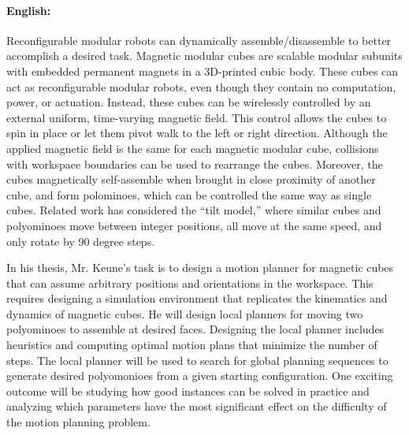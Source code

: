 \documentclass[11pt,a4paper,twoside,titlepage]{scrbook}
\theoremstyle{definition}
\begin{document}
\medskip

\paragraph{English:}
Reconfigurable modular robots can dynamically assemble/disassemble to better accomplish a desired task.
Magnetic modular cubes are scalable modular subunits with embedded permanent magnets in a 3D-printed cubic body.
These cubes can act as reconfigurable modular robots, even though they contain no computation, power, or actuation.
Instead, these cubes can be wirelessly controlled by an external uniform, time-varying magnetic field.
This control allows the cubes to spin in place or let them pivot walk to the left or right direction.
Although the applied magnetic field is the same for each magnetic modular cube, collisions with workspace boundaries can be used to rearrange the cubes.
Moreover, the cubes magnetically self-assemble when brought in close proximity of another cube, and form polominoes, which can be controlled the same way as single cubes.  
Related work has considered the “tilt model,” where similar cubes and polyominoes move between integer positions, all move at the same speed, and only rotate by 90 degree steps.

In his thesis, Mr. Keune's task is to design a motion planner for magnetic cubes that can assume arbitrary positions and orientations in the workspace.
This requires designing a simulation environment that replicates the kinematics and dynamics of magnetic cubes.
He will design local planners for moving two polyominoes to assemble at desired faces.
Designing the local planner includes heuristics and computing optimal motion plans that minimize the number of steps.
The local planner will be used to search for global planning sequences to generate desired polyomonioes from a given starting configuration.
One exciting outcome will be studying how good instances can be solved in practice and analyzing which parameters have the most significant effect on the difficulty of the motion planning problem. 
	
	
	
	\tableofcontents
	
	
	
	\mainmatter
	
	
	
	
	
	
\end{document}
